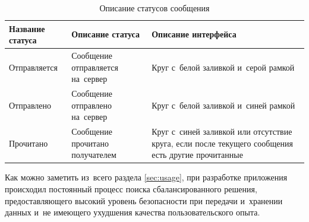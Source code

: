 \begin{table}[!ht]
  \caption{Описание статусов сообщения}
  \label{table:usage:dialogues:statusdesc}
  \centering
  \begin{tabularx}{\linewidth}{
    |>{\centering\hsize=0.75\hsize}X|
    >{\centering\hsize=1\hsize}X|
    >{\centering\arraybackslash\hsize=1.25\hsize}X|
  }
	\hline
	Название статуса & Описание статуса & Описание интерфейса \\

	\hline
	Отправляется & Сообщение отправляется на~сервер & Круг с~белой заливкой и~серой рамкой \\

	\hline
	Отправлено & Сообщение отправлено на~сервер & Круг с~белой заливкой и~синей рамкой \\

	\hline
	Прочитано & Сообщение прочитано получателем & Круг с~синей заливкой или отсутствие круга, если после текущего сообщения есть другие прочитанные \\

	\hline
  \end{tabularx}
\end{table}

Как можно заметить из~всего раздела \ref{sec:usage}, при разработке приложения происходил постоянный процесс поиска сбалансированного решения, предоставляющего высокий уровень безопасности при передачи и~хранении данных и~не имеющего ухудшения качества пользовательского опыта.